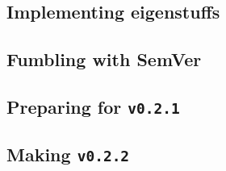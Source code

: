 \documentclass[../main.tex]{subfiles}
\begin{document}
\newpage

\subsection{Implementing eigenstuffs\label{development:implementing-eigenstuffs}}


\newpage

\subsection{Fumbling with SemVer\label{development:fumbling-with-semver}}


\newpage

\subsection{Preparing for \texttt{v0.2.1}\label{development:preparing-for-v0.2.1}}


\newpage

\subsection{Making \texttt{v0.2.2}\label{development:making-v0.2.2}}

\end{document}
